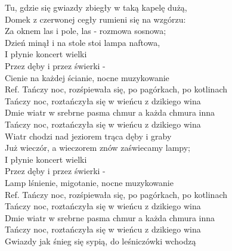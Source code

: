 
\begin{flushleft}
Tu, gdzie się gwiazdy zbiegły w taką kapelę dużą, \tab{}\\
Domek z czerwonej cegły rumieni się na wzgórzu: \tab{}\\
Za oknem las i pole, las - rozmowa sosnowa; \tab{}\\
Dzień minął i na stole stoi lampa naftowa, \tab{}\\
\vskip 3mm
I płynie koncert wielki \tab{}\tab{}\\
Przez dęby i przez świerki - \tab{}\\
Cienie na każdej ścianie, nocne muzykowanie \\
\vskip 3mm
Ref. Tańczy noc, rozśpiewała się, po pagórkach, po kotlinach \\
\hspace{0.9cm}Tańczy noc, roztańczyła się w wieńcu z dzikiego wina \\
\hspace{0.9cm}Dmie wiatr w srebrne pasma chmur a każda chmura inna \\
\hspace{0.9cm}Tańczy noc, roztańczyła się w wieńcu z dzikiego wina \\
\vskip 3mm
Wiatr chodzi  nad jeziorem trąca  dęby i graby \\
Już wieczór, a wieczorem znów zaświecamy lampy; \\
I płynie koncert wielki \\
Przez dęby i przez świerki - \\
Lamp lśnienie, migotanie, nocne muzykowanie \\
\vskip 3mm
Ref. Tańczy noc, rozśpiewała się, po pagórkach, po kotlinach\\
\hspace{0.9cm}Tańczy noc, roztańczyła się w wieńcu z dzikiego wina \\
\hspace{0.9cm}Dmie wiatr w srebrne pasma chmur a każda chmura inna \\
\hspace{0.9cm}Tańczy noc, roztańczyła się w wieńcu z dzikiego wina \\
\vskip 3mm
Gwiazdy jak śnieg się sypią, do leśniczówki wchodzą \\

\end{flushleft}
